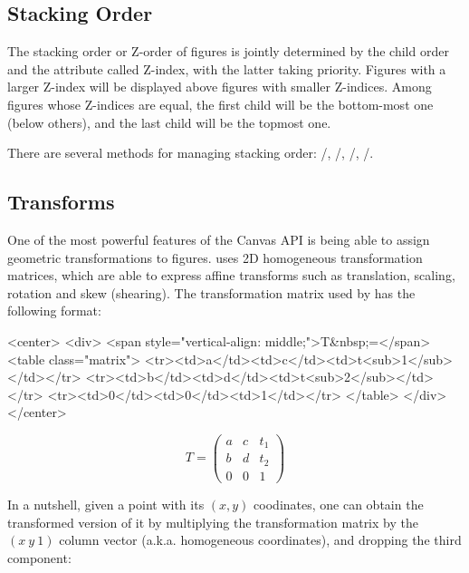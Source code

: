 \subsection{Stacking Order}
\label{sec:graphics:canvas-stacking-order}

The stacking order or Z-order of figures is jointly determined by the child
order and the  attribute called Z-index, with the latter
taking priority.
Figures with a larger Z-index will be displayed above figures with smaller
Z-indices. Among figures whose Z-indices are equal, the first child will be the
bottom-most one (below others), and the last child will be the
topmost one.

There are several methods for managing stacking order:
/, /,
/, /.


\subsection{Transforms}
\label{sec:graphics:canvas-transforms}

One of the most powerful features of the Canvas API is being able to assign
geometric transformations to figures. {\opp} uses 2D homogeneous
transformation matrices, which are able to express affine transforms such
as translation, scaling, rotation and skew (shearing). The
transformation matrix used by {\opp} has the following format:

\begin{htmlonly}
<center>
<div>
<span style="vertical-align: middle;">T&nbsp;=</span>
<table class="matrix">
  <tr><td>a</td><td>c</td><td>t<sub>1</sub></td></tr>
  <tr><td>b</td><td>d</td><td>t<sub>2</sub></td></tr>
  <tr><td>0</td><td>0</td><td>1</td></tr>
</table>
</div>
</center>
\end{htmlonly}

\begin{pdfonly}
\[ T = \left( \begin{array}{ccc}
a & c & t_1 \\
b & d & t_2 \\
0 & 0 & 1 \end{array} \right)\]
\end{pdfonly}

In a nutshell, given a point with its $(x, y)$ coodinates, one can obtain the
transformed version of it by multiplying the transformation matrix by the
$(x \ y \ 1)$ column vector (a.k.a. homogeneous coordinates), and dropping the
third component:

